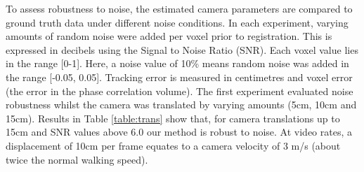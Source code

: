 To assess robustness to noise, the estimated camera parameters are compared to ground truth data under different noise conditions. In each experiment, varying amounts of random noise were added per voxel prior to registration. This is expressed in decibels using the Signal to Noise Ratio (SNR). Each voxel value lies in the range [0-1]. Here, a noise value of 10\% means random noise was added in the range [-0.05, 0.05]. Tracking error is measured in centimetres and voxel error (the error in the phase correlation volume). The first experiment evaluated noise robustness whilst the camera was translated by varying amounts (5cm, 10cm and 15cm). Results in Table \ref{table:trans} show that, for camera translations up to 15cm and SNR values above 6.0 our method is robust to noise. At video rates, a displacement of 10cm per frame equates to a camera velocity of 3 m/s (about twice the normal walking speed). 



